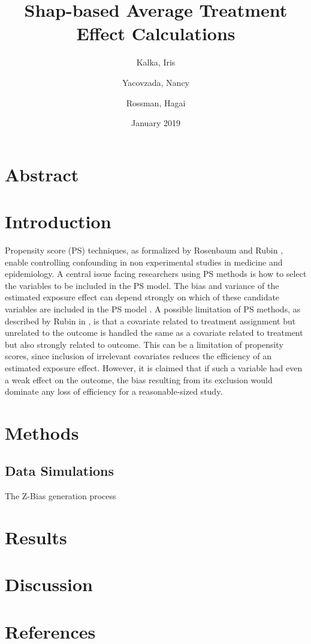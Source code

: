 \documentclass{article}
\title{Shap-based Average Treatment Effect Calculations}
\author{Kalka, Iris
        \and
        Yacovzada, Nancy
        \and
        Rossman, Hagai}
\date{January 2019}
\begin{document}
\maketitle

\section{Abstract}

\section{Introduction}
Propensity score (PS) techniques, as formalized by Rosenbaum and Rubin \cite{rosenbaum1983central}, enable  controlling confounding in non experimental studies in medicine and epidemiology. 
A central issue facing researchers using PS methods is how to select the variables to be included in the PS model. The bias and variance of the estimated exposure effect can depend strongly on which of these candidate variables are included in the PS model \cite{brookhart2006variable}.
A possible limitation of PS methods, as described by Rubin in \cite{rubin1997estimating}, is that a covariate related to treatment assignment but unrelated to the outcome is handled the same as a covariate related to treatment but also strongly related to outcome. 
This can be a limitation of propensity scores, since inclusion of irrelevant covariates reduces the efficiency of an estimated exposure effect.  However, it is claimed that if such a variable had even a weak effect on the outcome, the bias resulting from its exclusion would dominate any loss of efficiency for a reasonable-sized study. 
\section{Methods}
\subsection{Data Simulations}
The Z-Bias generation process \cite{myers2011effects}
\section{Results}

\section{Discussion}


\section{References}



\end{document}
